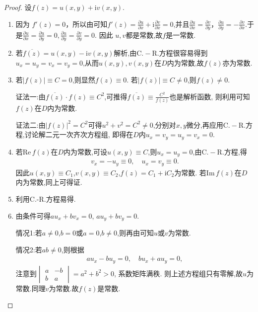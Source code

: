\documentclass[../../main.tex]{subfiles}%
\begin{document}
\begin{proof}

设$f(z)=u(x,y)+\mathrm{i}v(x,y)$.
\begin{enumerate}[(1)]
\item 因为 \( f'(z) = 0 \)，所以由可知\( f'(z) = \frac{\partial u}{\partial x} + \mathrm{i}\frac{\partial v}{\partial x} = 0 \),并且\( \frac{\partial u}{\partial x} = \frac{\partial v}{\partial y} \)，\( \frac{\partial u}{\partial y} = -\frac{\partial v}{\partial x} \).于是$\frac{\partial u}{\partial x}=\frac{\partial u}{\partial y}=0,\frac{\partial u}{\partial y}=\frac{\partial v}{\partial y}=0$.
因此 \( u,v \)都是常数,故$f$是一常数.

\item 若$\overline{f(z)}=u(x,y)-\mathrm{i}v(x,y)$解析,由$\mathrm{C.-R.}$方程很容易得到$u_x=u_y=v_x=v_y=0$,从而$u(x,y),v(x,y)$在$D$内为常数,故$f(z)$亦为常数.

\item 若$|f(z)|\equiv C=0$,则显然$f(z)\equiv0$.
若$|f(z)|\equiv C\neq0$,则$f(z)\neq0$.

{\color{blue}证法一:}由$\overline{f(z)}\cdot f(z)\equiv C^2$,可推得$\overline{f(z)}\equiv\frac{C^2}{f(z)}$也是解析函数,
则利用可知$f(z)$在$D$内为常数.

{\color{blue}证法二:}由$|f(z)|^2=C^2$可得$u^2+v^2=C^2\neq0$,分别对$x,y$微分,再应用$\mathrm{C.-R.}$方程,讨论解二元一次齐次方程组,
即得在$D$内$u_x=v_y=u_y=v_x=0$.

\item 若$\mathrm{Re}\,f(z)$在$D$内为常数,可设$u(x,y)\equiv C$,则$u_x=u_y=0$,由$\mathrm{C.-R.}$方程,得
\begin{align*}
v_x=-u_y\equiv0, \quad u_x=v_y\equiv0.
\end{align*}
因此$u(x,y)\equiv C_1$,$v(x,y)\equiv C_2$,$f(z)=C_1+\mathrm{i}C_2$为常数.
若$\mathrm{Im}\,f(z)$在$D$内为常数,同上可得证.

\item 利用C.-R.方程易得.

\item 由条件可得$au_x+bv_x=0$,$\,\,au_y+bv_y=0$.

情况1:若$a\neq0$,$b=0$或$a=0$,$b\neq0$,则再由可知$u$或$v$为常数.

情况2:若$ab\neq0$,则根据
\begin{align*}
au_x-bu_y=0, \quad bu_x+au_y=0,
\end{align*}
注意到$\begin{vmatrix} a & -b \\ b & a \end{vmatrix}=a^2+b^2>0$,
系数矩阵满秩.
则上述方程组只有零解,故$u$为常数.同理$v$为常数.故$f(z)$是常数.
\end{enumerate}

\end{proof}
\end{document}

